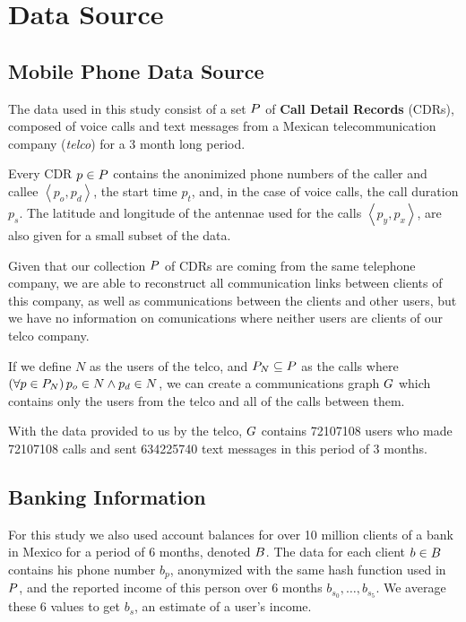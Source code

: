 \section{Data Source}

\subsection{Mobile Phone Data Source}

The data used in this study consist of a set \( \mathlarger{P} \) of \textbf{Call Detail Records} (CDRs), composed of voice calls and text messages from a Mexican telecommunication company (\textit{telco}) for a 3 month long period.

Every CDR \( p \in \mathlarger{P} \)  contains the anonimized phone numbers of the caller and callee \( \left< p_o, p_d \right> \), the start time \( p_t \), and, in the case of voice calls, the call duration \( p_s \). The latitude and longitude of the antennae used for the calls \( \left< p_y, p_x \right> \), are also given for a small subset of the data.

Given that our collection \( \mathlarger{P} \) of CDRs are coming from the same telephone company, we are able to reconstruct all communication links between clients of this company, as well as communications between the clients and other users, but we have no information on comunications where neither users are clients of our telco company.

If we define \( N \) as the users of the telco, and \( \mathlarger{P}_N \subseteq \mathlarger{P} \) as the calls where \( \left( \forall p \in \mathlarger{P}_N \right) p_o \in N \wedge p_d \in N \), we can create a communications graph \( \mathlarger{G} \) which contains only the users from the telco and all of the calls between them.

With the data provided to us by the telco, \( \mathlarger{G} \) contains \num{72107108} users who made \num{72107108} calls and sent \num{634225740} text messages in this period of 3 months.

\subsection{Banking Information}

For this study we also used account balances for over 10 million clients of a bank in Mexico for a period of 6 months, denoted \( \mathlarger{B} \). The data for each client \( b \in \mathlarger{B} \) contains his phone number \( b_p \), anonymized with the same hash function used in \( \mathlarger{P} \), and the reported income of this person over 6 months \( b_{s_0}, \ldots, b_{s_5} \). We average these 6 values to get \( b_s \), an estimate of a user's income.

